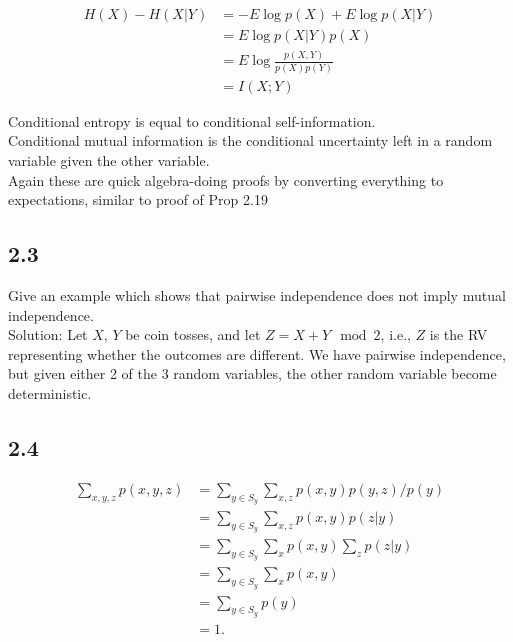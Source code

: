 \documentclass[../main.tex]{subfiles}
\begin{document}
\begin{proposition*}[2.19]
    \begin{align*}
H(X) - H(X|Y) &= -E \log p(X) + E \log p(X|Y) \\
&= E \log p(X|Y)p(X) \\
&= E \log \frac{p(X, Y)}{p(X)p(Y)} \\
&= I(X; Y)
\end{align*}
\end{proposition*}
\begin{proposition*}[2.21, 2.22]
    Conditional entropy is equal to conditional self-information.\\
    Conditional mutual information is the conditional uncertainty left in a random variable given the other variable.\\
    Again these are quick algebra-doing proofs by converting everything to expectations, similar to proof of Prop 2.19
\end{proposition*}
\subsection*{2.3}
Give an example which shows that pairwise independence does not imply mutual independence.\\
Solution: Let $X$, $Y$ be coin tosses, and let $Z=X+Y\mod 2$, i.e., $Z$ is the RV representing whether the outcomes are different. We have pairwise independence, but given either 2 of the 3 random variables, the other random variable become deterministic.
\subsection*{2.4}
\begin{align*}
\sum_{x,y,z} p(x, y, z) &= \sum_{y \in S_y} \sum_{x,z} p(x, y)p(y, z)/p(y) \\
&= \sum_{y \in S_y} \sum_{x,z} p(x, y)p(z|y) \\
&= \sum_{y \in S_y} \sum_{x} p(x, y) \sum_{z} p(z|y) \\
&= \sum_{y \in S_y} \sum_{x} p(x, y) \\
&= \sum_{y \in S_y} p(y) \\
&= 1.
\end{align*}
\end{document}
